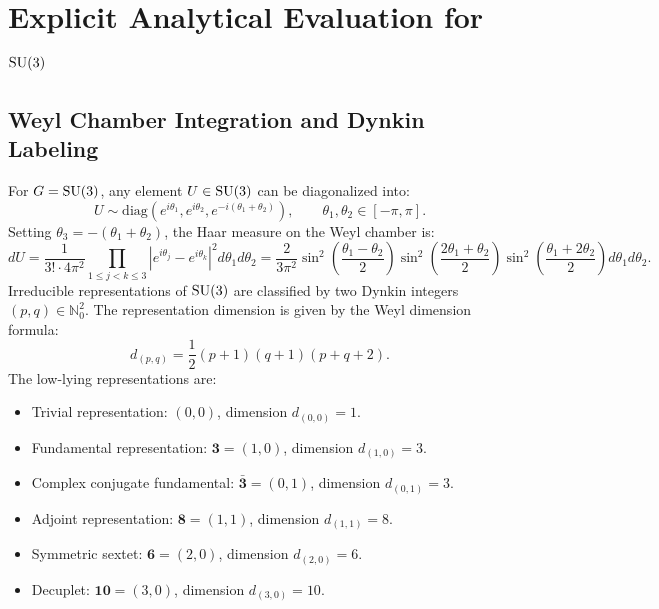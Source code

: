 \section{Explicit Analytical Evaluation for \texorpdfstring{$\mathrm{SU}(3)$}{SU(3)}}
\label{sec:explicit_su3}

\subsection{Weyl Chamber Integration and Dynkin Labeling}
\label{subsec:su3_weyl_dynkin}

For $G = \mathrm{SU}(3)$, any element $U \in \mathrm{SU}(3)$ can be diagonalized into:
\begin{equation}
U \sim \mathrm{diag}\left( e^{i\theta_1}, e^{i\theta_2}, e^{-i(\theta_1 + \theta_2)} \right), \qquad \theta_1, \theta_2 \in [-\pi, \pi].
\end{equation}
Setting $\theta_3 = -(\theta_1 + \theta_2)$, the Haar measure on the Weyl chamber is:
\begin{equation}
\label{eq:su3_reduced_haar}
dU = \frac{1}{3! \cdot 4\pi^2} \prod_{1 \le j < k \le 3} \left| e^{i\theta_j} - e^{i\theta_k} \right|^2 d\theta_1 d\theta_2 = \frac{2}{3\pi^2} \sin^2\left(\frac{\theta_1 - \theta_2}{2}\right) \sin^2\left(\frac{2\theta_1 + \theta_2}{2}\right) \sin^2\left(\frac{\theta_1 + 2\theta_2}{2}\right) d\theta_1 d\theta_2.
\end{equation}
Irreducible representations of $\mathrm{SU}(3)$ are classified by two Dynkin integers $(p, q) \in \mathbb{N}_0^2$. The representation dimension is given by the Weyl dimension formula:
\begin{equation}
\label{eq:weyl_dimension_su3}
d_{(p, q)} = \frac{1}{2} (p + 1)(q + 1)(p + q + 2).
\end{equation}
The low-lying representations are:
\begin{itemize}
    \item Trivial representation: $(0, 0)$, dimension $d_{(0,0)} = 1$.
    \item Fundamental representation: $\mathbf{3} = (1, 0)$, dimension $d_{(1,0)} = 3$.
    \item Complex conjugate fundamental: $\bar{\mathbf{3}} = (0, 1)$, dimension $d_{(0,1)} = 3$.
    \item Adjoint representation: $\mathbf{8} = (1, 1)$, dimension $d_{(1,1)} = 8$.
    \item Symmetric sextet: $\mathbf{6} = (2, 0)$, dimension $d_{(2,0)} = 6$.
    \item Decuplet: $\mathbf{10} = (3, 0)$, dimension $d_{(3,0)} = 10$.
\end{itemize}

